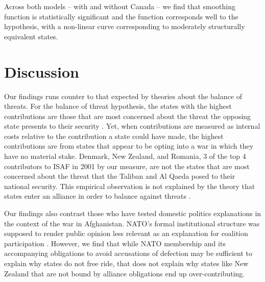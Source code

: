 \documentclass[12pt,letterpaper]{article}
\begin{document}
	Across both models -- with and without Canada -- we find that smoothing function is statistically significant and the function corresponds well to the hypothesis, with a non-linear curve corresponding to moderately structurally equivalent states.

\section{Discussion}
	Our findings runs counter to that expected by theories about the balance of threats. For the balance of threat hypothesis, the states with the highest contributions are those that are most concerned about the threat the opposing state presents to their security \citep{haesebrouck_democraticparticipationair_2016}. Yet, when contributions are measured as internal costs relative to the contribution a state could have made, the highest contributions are from states that appear to be opting into a war in which they have no material stake. Denmark, New Zealand, and Romania, 3 of the top 4 contributors to ISAF in 2001 by our measure, are not the states that are most concerned about the threat that the Taliban and Al Qaeda posed to their national security. This empirical observation is not explained by the theory that states enter an alliance in order to balance against threats \citep{walt_originsalliance_1987}.

	Our findings also contrast those who have tested domestic politics explanations in the context of the war in Afghanistan. NATO's formal institutional structure was supposed to render public opinion less relevant as an explanation for coalition participation \citep{kreps_eliteconsensusdeterminant_2010}. However, we find that while NATO membership and its accompanying obligations to avoid accusations of defection may be sufficient to explain why states do not free ride, that does not explain why states like New Zealand that are not bound by alliance obligations end up over-contributing.
\end{document}
